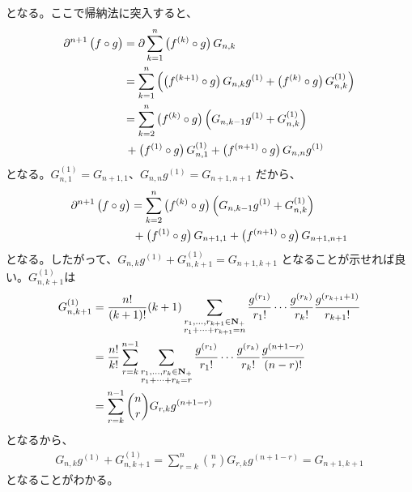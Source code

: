 {\begin{todo}[やるべきこと]
\begin{itemize}
			となる。ここで帰納法に突入すると、
			\begin{equation*}\begin{split}
				{\partial}^{n+1}\mathinner{\bigl({f\circ g}\bigr)} &= {\partial} \sum_{k=1}^n
					\mathinner{\bigl({f^{(k)}\circ g}\bigr)}G_{n,k} \\
				&= \sum_{k=1}^n\mathinner{\Bigl({\mathinner{\bigl({f^{(k+1)}\circ g}\bigr)}G_{n,k}g^{(1)}
					+ \mathinner{\bigl({f^{(k)}\circ g}\bigr)}G_{n,k}^{(1)}}\Bigr)} \\
				&= \sum_{k=2}^n \mathinner{\bigl({f^{(k)}\circ g}\bigr)}
					\mathinner{\Bigl({G_{n,k-1}g^{(1)} + G_{n,k}^{(1)}}\Bigr)} \\
				&\,+ \mathinner{\bigl({f^{(1)}\circ g}\bigr)}G_{n,1}^{(1)}
					+ \mathinner{\bigl({f^{(n+1)}\circ g}\bigr)}G_{n,n}g^{(1)}
			\end{split}\end{equation*}
			となる。$G_{n,1}^{(1)}=G_{n+1,1}$、$G_{n,n}g^{(1)}=G_{n+1,n+1}$
			だから、
			\begin{equation*}\begin{split}
				{\partial}^{n+1}\mathinner{\bigl({f\circ g}\bigr)} &= \sum_{k=2}^n \mathinner{\bigl({f^{(k)}\circ g}\bigr)}
					\mathinner{\Bigl({G_{n,k-1}g^{(1)} + G_{n,k}^{(1)}}\Bigr)} \\
				&\,+ \mathinner{\bigl({f^{(1)}\circ g}\bigr)}G_{n+1,1} 
					+ \mathinner{\bigl({f^{(n+1)}\circ g}\bigr)}G_{n+1,n+1}
			\end{split}\end{equation*}
			となる。したがって、$G_{n,k}g^{(1)} + G_{n,k+1}^{(1)} = G_{n+1,k+1}$
			となることが示せれば良い。$G_{n,k+1}^{(1)}$は
			\begin{equation*}\begin{split}
				G_{n,k+1}^{(1)} &= \frac{n!}{(k+1)!}(k+1)
					\sum_{\substack{r_1,\dots,r_{k+1}\in\mathbf{N}_+\\r_1+\cdots+r_{k+1}=n}}
					\frac{g^{(r_1)}}{r_1!}\cdots\frac{g^{(r_k)}}{r_k!}
					\frac{g^{(r_{k+1}+1)}}{r_{k+1}!} \\
				&= \frac{n!}{k!} \sum_{r=k}^{n-1}
					\sum_{\substack{r_1,\dots,r_k\in\mathbf{N}_+\\r_1+\cdots+r_k=r}}
					\frac{g^{(r_1)}}{r_1!}\cdots\frac{g^{(r_k)}}{r_k!}
					\frac{g^{(n+1-r)}}{(n-r)!} \\
				&= \sum_{r=k}^{n-1}\binom{n}{r} G_{r,k} g^{(n+1-r)}
			\end{split}\end{equation*}
			となるから、
			\begin{equation*}\begin{split}
				G_{n,k}g^{(1)} + G_{n,k+1}^{(1)}
				= \sum_{r=k}^n\binom{n}{r} G_{r,k} g^{(n+1-r)}
				= G_{n+1,k+1}
			\end{split}\end{equation*}
			となることがわかる。
		\end{itemize} %
		\EOP
	\end{todo} %
}
